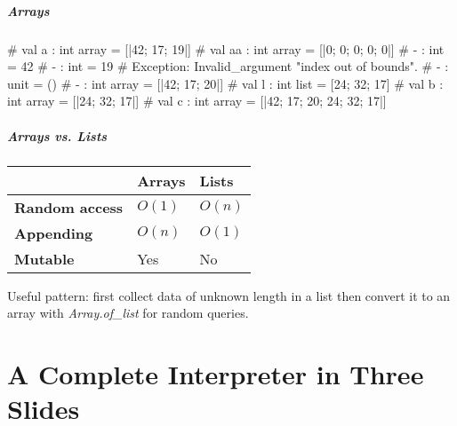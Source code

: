 \documentclass{plt}
\begin{document}
\begin{frame}[fragile]
  \frametitle{Arrays}

\begin{interactive}
# 
val a : int array = [|42; 17; 19|]
# 
val aa : int array = [|0; 0; 0; 0; 0|]
# 
- : int = 42
# 
- : int = 19
# 
Exception: Invalid_argument "index out of bounds".
# 
- : unit = ()
# 
- : int array = [|42; 17; 20|]
# 
val l : int list = [24; 32; 17]
# 
val b : int array = [|24; 32; 17|]
# 
val c : int array = [|42; 17; 20; 24; 32; 17|]
\end{interactive}

\end{frame}

\begin{frame}
  \frametitle{Arrays vs. Lists}

  \begin{center}
    \begin{tabular}{lll}
\toprule
& \textbf{Arrays} & \textbf{Lists} \\
\midrule
\textbf{Random access} & $O(1)$ & $O(n)$ \\
\textbf{Appending} & $O(n)$ & $O(1)$ \\
\textbf{Mutable} & Yes & No \\
\bottomrule
    \end{tabular}
  \end{center}

\medskip

Useful pattern: first collect data of unknown length in a list then
convert it to an array with \emph{Array.of\_list} for random queries.

\end{frame}


\part{A Complete Interpreter in Three Slides}
\end{document}
